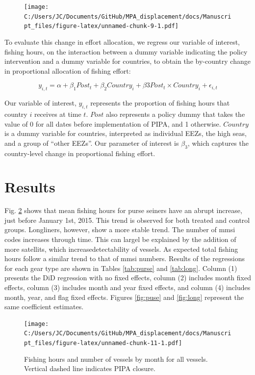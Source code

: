 \documentclass[]{article}
\begin{document}
\begin{figure}
\centering
\texttt{[image: C:/Users/JC/Documents/GitHub/MPA\_displacement/docs/Manuscript\_files/figure-latex/unnamed-chunk-9-1.pdf]}
\caption{\label{fig:unnamed-chunk-9}\label{fig:redist_trend}}
\end{figure}

To evaluate this change in effort allocation, we regress our variable of
interest, fishing hours, on the interaction between a dummy variable
indicating the policy intervention and a dummy variable for countries,
to obtain the by-country change in proportional allocation of fishing
effort:

\[
y_{i,t} = \alpha + \beta_1Post_t + \beta_2Country_i + \beta3Post_t \times Country_i + \epsilon_{i,t}
\]

Our variable of interest, \(y_{i,t}\) represents the proportion of
fishing hours that country \(i\) receives at time \(t\). \(Post\) also
represents a policy dummy that takes the value of 0 for all dates before
implementation of PIPA, and 1 otherwise. \(Country\) is a dummy variable
for countries, interpreted as individual EEZs, the high seas, and a
group of ``other EEZs''. Our parameter of interest is \(\beta_3\), which
captures the country-level change in proportional fishing effort.

\section{Results}\label{results}

Fig. \ref{fig:all_vessels} shows that mean fishing hours for purse
seiners have an abrupt increase, just before January 1st, 2015. This
trend is observed for both treated and control groups. Longliners,
however, show a more stable trend. The number of mmsi codes increases
through time. This can largel be explained by the addition of more
satellits, which increasedetectability of vessels. As expected total
fishing hours follow a similar trend to that of mmsi numbers. Results of
the regressions for each gear type are shown in Tables \ref{tab:purse}
and \ref{tab:long}. Column (1) presents the DiD regression with no fixed
effects, column (2) includes month fixed effects, column (3) includes
month and year fixed effects, and column (4) includes month, year, and
flag fixed effects. Figures \ref{fig:puse} and \ref{fig:long} represent
the same coefficient estimates.

\begin{figure}
\centering
\texttt{[image: C:/Users/JC/Documents/GitHub/MPA\_displacement/docs/Manuscript\_files/figure-latex/unnamed-chunk-11-1.pdf]}
\caption{\label{fig:unnamed-chunk-11}\label{fig:all_vessels}Fishing hours
and number of vessels by month for all vessels. Vertical dashed line
indicates PIPA closure.}
\end{figure}
\end{document}
